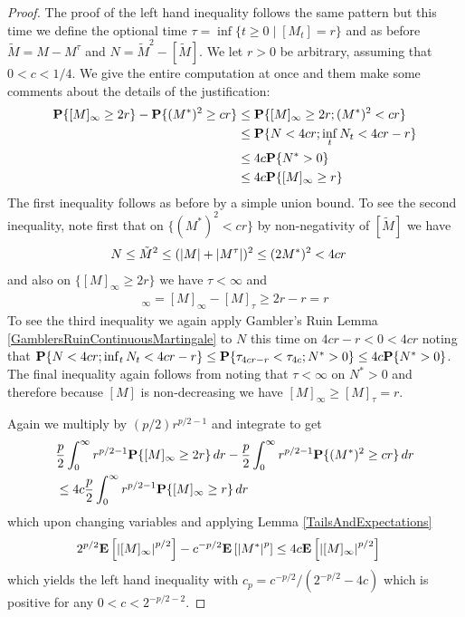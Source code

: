 \begin{proof}
The proof of the left hand inequality follows the same pattern but this time we define the optional time $\tau = \inf \lbrace t \geq 0 \mid [M_t] = r \rbrace$ and as before $\tilde{M} = M - M^\tau$ and $N = \tilde{M}^2 - [\tilde{M}]$.  We let $r > 0$ be arbitrary, assuming that $0 < c < 1/4$.  We give the entire computation at once and them make some comments about the details of the justification:
\begin{align*}
\textbf{P}\{[M]_\infty \geq 2r \} - \textbf{P}\{(M^*)^2 \geq cr\} &\leq \textbf{P}\{[M]_\infty \geq 2r ; (M^*)^2 < cr\} \\
&\leq \textbf{P}\{N < 4cr ; \inf_t N_t < 4cr -r\} \\
&\leq 4c \textbf{P}\{N^* > 0\} \\
&\leq 4c \textbf{P}\{[M]_\infty \geq r\}
\end{align*}
The first inequality follows as before by a simple union bound.  To see the second inequality, note first that on $\lbrace (M^*)^2 < cr \rbrace$ by non-negativity of $[\tilde{M}]$ we have 
\begin{align*}
N &\leq \tilde{M}^2 \leq (\left \vert M \right \vert + \left \vert M^\tau \right \vert)^2 \leq (2 M^*)^2 < 4 cr
\end{align*}
and also on $\lbrace [M]_\infty \geq 2r \rbrace$ we have $\tau < \infty$ and 
\begin{align*}
[\tilde{M}]_\infty = [M]_\infty - [M]_\tau \geq 2r - r = r
\end{align*}
To see the third inequality we again apply Gambler's Ruin Lemma \ref{GamblersRuinContinuousMartingale} to $N$  this time on $4cr - r < 0 < 4 cr$ noting that $\textbf{P}\{N < 4cr ; \inf_t N_t < 4cr -r\} \leq \textbf{P}\{ \tau_{4cr - r} <  \tau_{4c} ; N^* > 0\} \leq 4c \textbf{P}\{N^* > 0\}$.  The final inequality again follows from noting that $\tau < \infty$ on $N^* > 0$ and therefore because $[M]$ is non-decreasing we have $[M]_\infty \geq [M]_\tau = r$.

Again we multiply by $(p/2) r^{p/2 -1}$ and integrate to get 
\begin{align*}
&\frac{p}{2} \int_0^\infty r^{p/2 -1} \textbf{P}\{[M]_\infty \geq 2r \} \, dr - \frac{p}{2} \int_0^\infty r^{p/2 -1} \textbf{P}\{(M^*)^2 \geq cr\} \, dr\\
&\leq 4c \frac{p}{2} \int_0^\infty r^{p/2 -1} \textbf{P}\{[M]_\infty \geq r\} \, dr
\end{align*}
which upon changing variables and applying Lemma \ref{TailsAndExpectations}
\begin{align*}
2^{p/2} \textbf{E}\left[\left \vert [M]_\infty \right \vert^{p/2}\right] - c^{-p/2} \textbf{E}\left[\left \vert M^* \right \vert^p\right] &\leq 4c \textbf{E}\left[\left \vert [M]_\infty \right \vert^{p/2}\right] 
\end{align*}
which yields the left hand inequality with $c_p = c^{-p/2}/(2^{-p/2} -4c)$ which is positive for any $0 < c < 2^{-p/2 - 2}$.
\end{proof}

